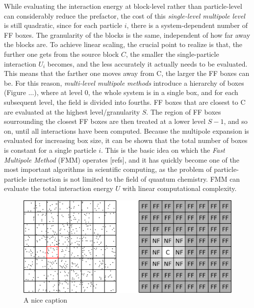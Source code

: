 \noindent While evaluating the interaction energy at block-level rather than particle-level can considerably reduce the prefactor, the cost of this \emph{single-level multipole level} is still quadratic, since for each particle $i$, there is a system-dependent number of FF boxes. The granularity of the blocks is the same, independent of how far away the blocks are. To achieve linear scaling, the crucial point to realize is that, the further one gets from the source block $C$, the smaller the single-particle interaction $U_i$ becomes, and the less accurately it actually needs to be evaluated. This means that the farther one moves away from C, the larger the FF boxes can be. For this reason, \emph{multi-level multipole methods} introduce a hierarchy of boxes (Figure ...), where at level 0, the whole system is in a single box, and for each subsequent level, the field is divided into fourths. FF boxes that are closest to C are evaluated at the highest level/granularity $S$. The region of FF boxes sourrounding the closest FF boxes are then treated at a lower level $S-1$, and so on, until all interactions have been computed. Because the multipole expansion is evaluated for increasing box size, it can be shown that the total number of boxes is constant for a single particle $i$. This is the basic idea on which the \emph{Fast Multipole Method} (FMM) operates [refs], and it has quickly become one of the most important algorithms in scientific computing, as the problem of particle-particle interaction is not limited to the field of quantum chemistry. FMM can evaluate the total interaction energy $U$ with linear computational complexity.

\begin{figure}
\centering
\includegraphics[scale=0.35]{Pics/FMM1}
\caption{A nice caption}
\end{figure}

